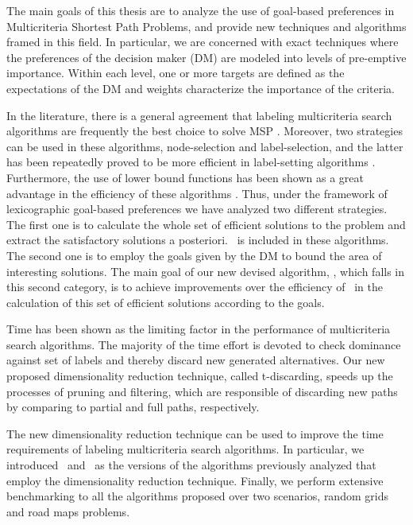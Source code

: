 The main goals of this thesis are to analyze the use of goal-based preferences in Multicriteria Shortest Path Problems, and provide new techniques and algorithms framed in this field. In particular, we are concerned with exact techniques where the preferences of the decision maker (DM) are modeled into levels of pre-emptive importance. Within each level, one or more targets are defined as the expectations of the DM and weights characterize the importance of the criteria. 

In the literature, there is a general agreement that labeling multicriteria search algorithms are frequently the best choice to solve MSP \citep{skriverandersen2000,Raith2009,Raith2009a}. Moreover, two strategies can be used in these algorithms, node-selection and label-selection, and the latter has been repeatedly proved to be more efficient in label-setting algorithms \citep{Paixao2007,PerezdelaCruz2013}. Furthermore, the use of lower bound functions has been shown as a great advantage in the efficiency of these algorithms \citep{Mandow2010, Machuca2012a}. Thus, under the framework of lexicographic goal-based preferences we have analyzed two different strategies. The first one is to calculate the whole set of efficient solutions to the problem and extract the satisfactory solutions a posteriori. \namoa \ is included in these algorithms. The second one is to employ the goals given by the DM to bound the area of interesting solutions. The main goal of our new devised algorithm, \lexgo, which falls in this second category, is to achieve improvements over the efficiency of \namoa \ in the calculation of this set of efficient solutions according to the goals.

Time has been shown as the limiting factor in the performance of multicriteria search algorithms. The majority of the time effort is devoted to check dominance against set of labels and thereby discard new generated alternatives. Our new proposed dimensionality reduction technique, called t-discarding, speeds up the processes of pruning and filtering, which are responsible of discarding new paths by comparing to partial and full paths, respectively.  

The new dimensionality reduction technique can be used to improve the time requirements of labeling multicriteria search algorithms. In particular, we introduced \namoate \ and \lexgote \ as the versions of the algorithms previously analyzed that employ the dimensionality reduction technique. Finally, we perform extensive benchmarking to all the algorithms proposed over two scenarios, random grids and road maps problems. 

